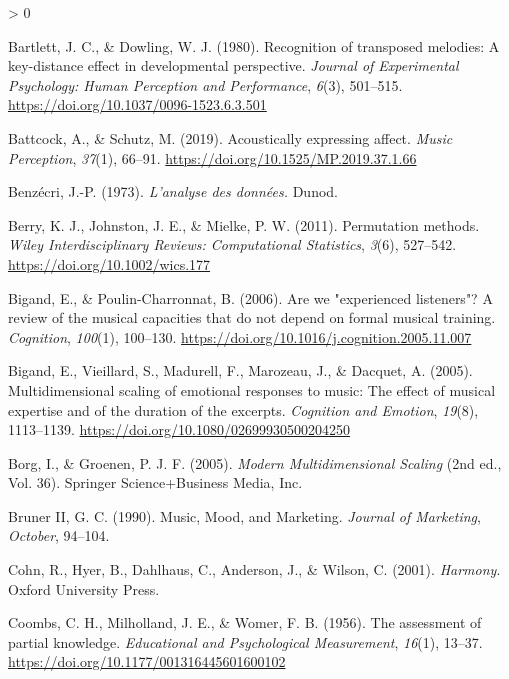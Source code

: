 \documentclass[
  english,
  man,floatsintext]{apa6}
\newlength{\cslhangindent}
\newenvironment{CSLReferences}[2] %
 {%
  \setlength{\parindent}{0pt}
  \ifodd #1 \everypar{\setlength{\hangindent}{\cslhangindent}}\ignorespaces\fi
  \ifnum #2 > 0
  \setlength{\parskip}{#2\baselineskip}
  \fi
 }%
 {}
\begin{document}
\begin{CSLReferences}{1}{0}
\leavevmode\hypertarget{ref-Bartlett1980}{}%
Bartlett, J. C., \& Dowling, W. J. (1980). {Recognition of transposed melodies: A key-distance effect in developmental perspective}. \emph{Journal of Experimental Psychology: Human Perception and Performance}, \emph{6}(3), 501--515. \url{https://doi.org/10.1037/0096-1523.6.3.501}

\leavevmode\hypertarget{ref-Battcock2019}{}%
Battcock, A., \& Schutz, M. (2019). {Acoustically expressing affect}. \emph{Music Perception}, \emph{37}(1), 66--91. \url{https://doi.org/10.1525/MP.2019.37.1.66}

\leavevmode\hypertarget{ref-Benzecri1973}{}%
Benzécri, J.-P. (1973). \emph{{L'analyse des données.}} Dunod.

\leavevmode\hypertarget{ref-Berry2011}{}%
Berry, K. J., Johnston, J. E., \& Mielke, P. W. (2011). {Permutation methods}. \emph{Wiley Interdisciplinary Reviews: Computational Statistics}, \emph{3}(6), 527--542. \url{https://doi.org/10.1002/wics.177}

\leavevmode\hypertarget{ref-Bigand2006}{}%
Bigand, E., \& Poulin-Charronnat, B. (2006). {Are we "experienced listeners"? A review of the musical capacities that do not depend on formal musical training}. \emph{Cognition}, \emph{100}(1), 100--130. \url{https://doi.org/10.1016/j.cognition.2005.11.007}

\leavevmode\hypertarget{ref-Bigand2005}{}%
Bigand, E., Vieillard, S., Madurell, F., Marozeau, J., \& Dacquet, A. (2005). {Multidimensional scaling of emotional responses to music: The effect of musical expertise and of the duration of the excerpts}. \emph{Cognition and Emotion}, \emph{19}(8), 1113--1139. \url{https://doi.org/10.1080/02699930500204250}

\leavevmode\hypertarget{ref-Borg2005}{}%
Borg, I., \& Groenen, P. J. F. (2005). \emph{{Modern Multidimensional Scaling}} (2nd ed., Vol. 36). Springer Science+Business Media, Inc.

\leavevmode\hypertarget{ref-BrunerII1990}{}%
Bruner II, G. C. (1990). {Music, Mood, and Marketing}. \emph{Journal of Marketing}, \emph{October}, 94--104.

\leavevmode\hypertarget{ref-Cohn2001}{}%
Cohn, R., Hyer, B., Dahlhaus, C., Anderson, J., \& Wilson, C. (2001). \emph{{Harmony}}. Oxford University Press.

\leavevmode\hypertarget{ref-Coombs1956}{}%
Coombs, C. H., Milholland, J. E., \& Womer, F. B. (1956). {The assessment of partial knowledge}. \emph{Educational and Psychological Measurement}, \emph{16}(1), 13--37. \url{https://doi.org/10.1177/001316445601600102}


\end{CSLReferences}
\end{document}
